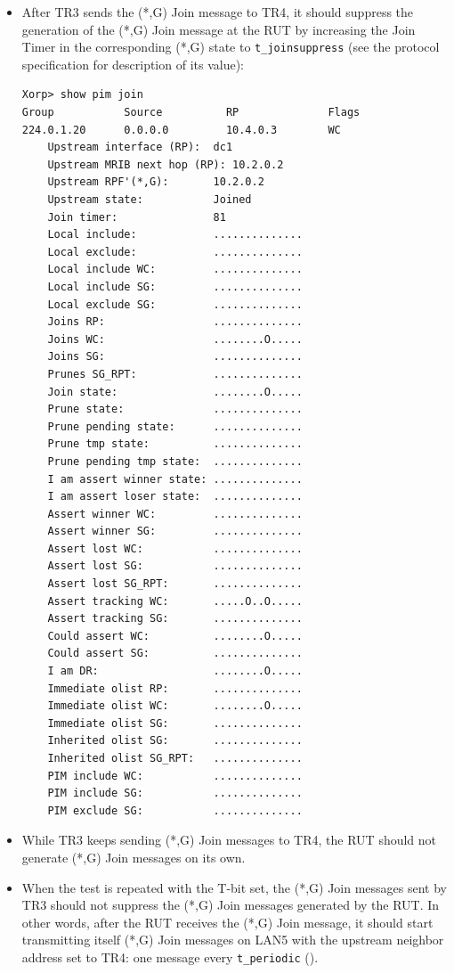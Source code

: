 \documentclass[11pt]{report}
\begin{document}
\begin{itemize}
  \item After TR3 sends the (*,G) Join message to TR4, it should suppress
  the generation of the (*,G) Join message at the RUT by increasing the
  Join Timer in the corresponding (*,G) state to \verb=t_joinsuppress=
  (see the protocol specification for description of its value):

\begin{verbatim}
Xorp> show pim join 
Group           Source          RP              Flags
224.0.1.20      0.0.0.0         10.4.0.3        WC   
    Upstream interface (RP):  dc1
    Upstream MRIB next hop (RP): 10.2.0.2
    Upstream RPF'(*,G):       10.2.0.2
    Upstream state:           Joined 
    Join timer:               81
    Local include:            ..............
    Local exclude:            ..............
    Local include WC:         ..............
    Local include SG:         ..............
    Local exclude SG:         ..............
    Joins RP:                 ..............
    Joins WC:                 ........O.....
    Joins SG:                 ..............
    Prunes SG_RPT:            ..............
    Join state:               ........O.....
    Prune state:              ..............
    Prune pending state:      ..............
    Prune tmp state:          ..............
    Prune pending tmp state:  ..............
    I am assert winner state: ..............
    I am assert loser state:  ..............
    Assert winner WC:         ..............
    Assert winner SG:         ..............
    Assert lost WC:           ..............
    Assert lost SG:           ..............
    Assert lost SG_RPT:       ..............
    Assert tracking WC:       .....O..O.....
    Assert tracking SG:       ..............
    Could assert WC:          ........O.....
    Could assert SG:          ..............
    I am DR:                  ........O.....
    Immediate olist RP:       ..............
    Immediate olist WC:       ........O.....
    Immediate olist SG:       ..............
    Inherited olist SG:       ..............
    Inherited olist SG_RPT:   ..............
    PIM include WC:           ..............
    PIM include SG:           ..............
    PIM exclude SG:           ..............
\end{verbatim}

  \item While TR3 keeps sending (*,G) Join messages to TR4, the RUT should
  not generate (*,G) Join messages on its own.

  \item When the test is repeated with the T-bit set, the (*,G) Join
  messages sent by TR3 should not suppress the (*,G) Join messages
  generated by the RUT. In other words, after the RUT receives the (*,G)
  Join message, it should start transmitting itself (*,G) Join messages on
  LAN5 with the upstream neighbor address set to TR4: one message every
  \verb=t_periodic= ({\PimsmTPeriodic}).

\end{itemize}
\end{document}
